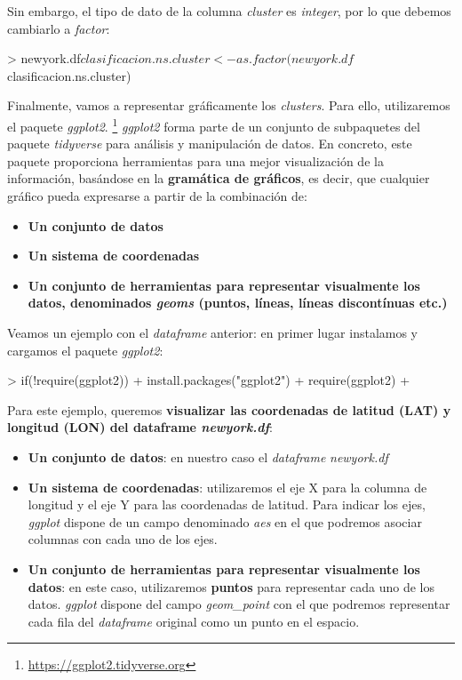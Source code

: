 \documentclass [a4paper] {article}
\begin{document}
Sin embargo, el tipo de dato de la columna \textit{cluster} es \textit{integer}, por lo que debemos cambiarlo a \textit{factor}:
\begin{Schunk}
\begin{Sinput}
> newyork.df$clasificacion.ns.cluster <- as.factor(newyork.df$clasificacion.ns.cluster)
\end{Sinput}
\end{Schunk}

Finalmente, vamos a representar gráficamente los \textit{clusters}. Para ello, utilizaremos el paquete \textit{ggplot2}. \footnote{\url{https://ggplot2.tidyverse.org}}
\textit{ggplot2} forma parte de un conjunto de subpaquetes del paquete \textit{tidyverse} para análisis y manipulación de datos. En concreto, este paquete proporciona herramientas para una mejor visualización de la información, basándose en la \textbf{gramática de gráficos}, es decir, que cualquier gráfico pueda expresarse a partir de la combinación de:
\begin{itemize}
  \item \textbf{Un conjunto de datos}
  \item \textbf{Un sistema de coordenadas}
  \item \textbf{Un conjunto de herramientas para representar visualmente los datos, denominados \textit{geoms} (puntos, líneas, líneas discontínuas etc.)}
\end{itemize}

Veamos un ejemplo con el \textit{dataframe} anterior: en primer lugar instalamos y cargamos el paquete \textit{ggplot2}:
\begin{Schunk}
\begin{Sinput}
> if(!require(ggplot2)){
+   install.packages("ggplot2")
+   require(ggplot2)
+ }
\end{Sinput}
\end{Schunk}

Para este ejemplo, queremos \textbf{visualizar las coordenadas de latitud (LAT) y longitud (LON) del dataframe \textit{newyork.df}}:
\begin{itemize}
  \item \textbf{Un conjunto de datos}: en nuestro caso el \textit{dataframe} \textit{newyork.df}
  \item \textbf{Un sistema de coordenadas}: utilizaremos el eje X para la columna de longitud y el eje Y para las coordenadas de latitud. Para indicar los ejes, \textit{ggplot} dispone de un campo denominado \textit{aes} en el que podremos asociar columnas con cada uno de los ejes. 
  \item \textbf{Un conjunto de herramientas para representar visualmente los datos}: en este caso, utilizaremos \textbf{puntos} para representar cada uno de los datos. \textit{ggplot} dispone del campo \textit{geom\_point} con el que podremos representar cada fila del \textit{dataframe} original como un punto en el espacio.
\end{itemize}
\end{document}
